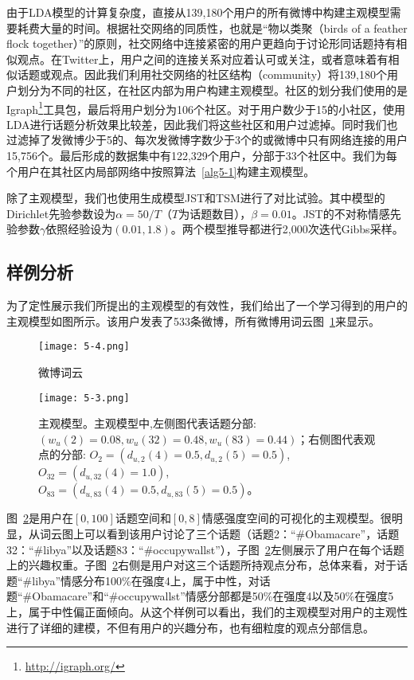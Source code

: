 由于LDA模型的计算复杂度，直接从139,180个用户的所有微博中构建主观模型需要耗费大量的时间。根据社交网络的同质性，也就是“物以类聚（birds of a feather flock together）”的原则，社交网络中连接紧密的用户更趋向于讨论形同话题持有相似观点。在Twitter上，用户之间的连接关系对应着认可或关注，或者意味着有相似话题或观点。因此我们利用社交网络的社区结构（community）将139,180个用户划分为不同的社区，在社区内部为用户构建主观模型。社区的划分我们使用的是
Igraph\footnote{\url{http://igraph.org/}}工具包，最后将用户划分为106个社区。对于用户数少于15的小社区，使用LDA进行话题分析效果比较差，因此我们将这些社区和用户过滤掉。同时我们也过滤掉了发微博少于5的、每次发微博字数少于3个的或微博中只有网络连接的用户15,756个。最后形成的数据集中有122,329个用户，分部于33个社区中。我们为每个用户在其社区内局部网络中按照算法~\ref{alg5-1}构建主观模型。

除了主观模型，我们也使用生成模型JST和TSM进行了对比试验。其中模型的Dirichlet先验参数设为$ \alpha=50/T $（$ T $为话题数目），$ \beta=0.01 $。JST的不对称情感先验参数$ \gamma $依照经验设为$ (0.01, 1.8) $。两个模型推导都进行2,000次迭代Gibbs采样。

\subsection{样例分析}
为了定性展示我们所提出的主观模型的有效性，我们给出了一个学习得到的用户的主观模型如图所示。该用户发表了533条微博，所有微博用词云图~\ref{fig5:a}来显示。

\begin{figure}[htb]
\centering
\texttt{[image: 5-4.png]}
\caption{微博词云}
\label{fig5:a}
\end{figure}

\begin{figure}[htb]
\centering
\texttt{[image: 5-3.png]}
\caption{主观模型。主观模型中,左侧图代表话题分部: $ (  w_{u}\left( 2 \right)=0.08,w_{u}\left( 32 \right)=0.48, w_{u}\left( 83 \right)=0.44)  $；右侧图代表观点的分部: $ O_{2}=( d_{u,2} \left( 4 \right)=0.5, d_{u,2} \left( 5 \right)=0.5)$, $O_{32}=(d_{u,32} \left( 4 \right)=1.0) $, $ O_{83}=( d_{u,83} \left( 4 \right)=0.5, d_{u,83} \left( 5 \right)=0.5 ) $。}
\label{fig5:b}
\end{figure}

图~\ref{fig5:b}是用户在$ [0,100] $话题空间和$ [0,8] $情感强度空间的可视化的主观模型。很明显，从词云图上可以看到该用户讨论了三个话题（话题2：``\#Obamacare''，话题32：``\#libya''以及话题83：``\#occupywallst''），子图~\ref{fig5:b}左侧展示了用户在每个话题上的兴趣权重。子图~\ref{fig5:b}右侧是用户对这三个话题所持观点分布，总体来看，对于话题``\#libya''情感分布100\%在强度4上，属于中性，对话题``\#Obamacare''和``\#occupywallst''情感分部都是50\%在强度4以及50\%在强度5上，属于中性偏正面倾向。从这个样例可以看出，我们的主观模型对用户的主观性进行了详细的建模，不但有用户的兴趣分布，也有细粒度的观点分部信息。

